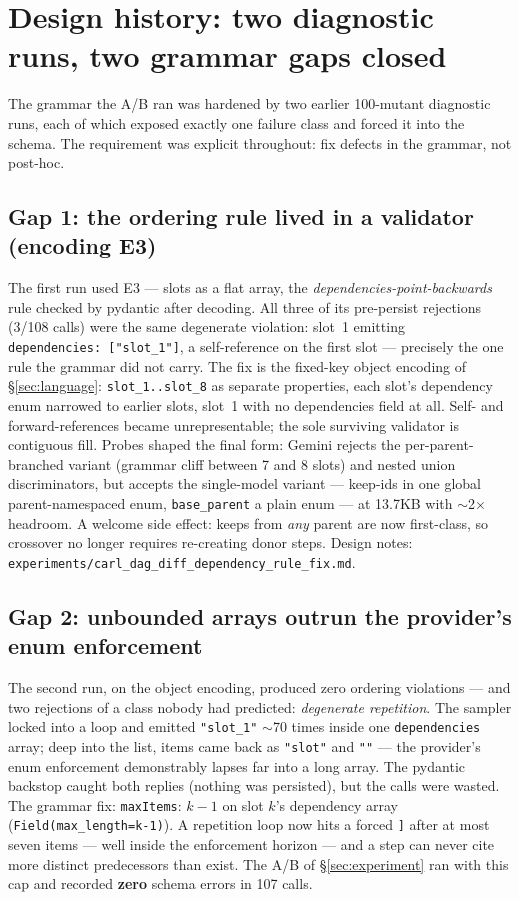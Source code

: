 \documentclass[11pt]{article}
\begin{document}
\section{Design history: two diagnostic runs, two grammar gaps closed}
\label{sec:depfix}
The grammar the A/B ran was hardened by two earlier 100-mutant diagnostic runs, each of
which exposed exactly one failure class and forced it into the schema. The requirement was
explicit throughout: fix defects in the grammar, not post-hoc.

\subsection{Gap 1: the ordering rule lived in a validator (encoding E3)}
The first run used E3 --- slots as a flat array, the \emph{dependencies-point-backwards}
rule checked by pydantic after decoding. All three of its pre-persist rejections (3/108
calls) were the same degenerate violation: slot~1 emitting
\texttt{dependencies:\ ["slot\_1"]}, a self-reference on the first slot --- precisely the
one rule the grammar did not carry. The fix is the fixed-key object encoding of
\S\ref{sec:language}: \texttt{slot\_1..slot\_8} as separate properties, each slot's
dependency enum narrowed to earlier slots, slot~1 with no dependencies field at all.
Self- and forward-references became unrepresentable; the sole surviving validator is
contiguous fill. Probes shaped the final form: Gemini rejects the per-parent-branched
variant (grammar cliff between 7 and 8 slots) and nested union discriminators, but accepts
the single-model variant --- keep-ids in one global parent-namespaced enum,
\texttt{base\_parent} a plain enum --- at 13.7KB with $\sim$2$\times$ headroom. A welcome
side effect: keeps from \emph{any} parent are now first-class, so crossover no longer
requires re-creating donor steps. Design notes:
\texttt{experiments/carl\_dag\_diff\_dependency\_rule\_fix.md}.

\subsection{Gap 2: unbounded arrays outrun the provider's enum enforcement}
The second run, on the object encoding, produced zero ordering violations --- and two
rejections of a class nobody had predicted: \emph{degenerate repetition}. The sampler
locked into a loop and emitted \texttt{"slot\_1"} $\sim$70 times inside one
\texttt{dependencies} array; deep into the list, items came back as \texttt{"slot"} and
\texttt{""} --- the provider's enum enforcement demonstrably lapses far into a long array.
The pydantic backstop caught both replies (nothing was persisted), but the calls were
wasted. The grammar fix: \texttt{maxItems}: $k-1$ on slot $k$'s dependency array
(\texttt{Field(max\_length=k-1)}). A repetition loop now hits a forced \texttt{]} after at
most seven items --- well inside the enforcement horizon --- and a step can never cite more
distinct predecessors than exist. The A/B of \S\ref{sec:experiment} ran with this cap and
recorded \textbf{zero} schema errors in 107 calls.
\end{document}
